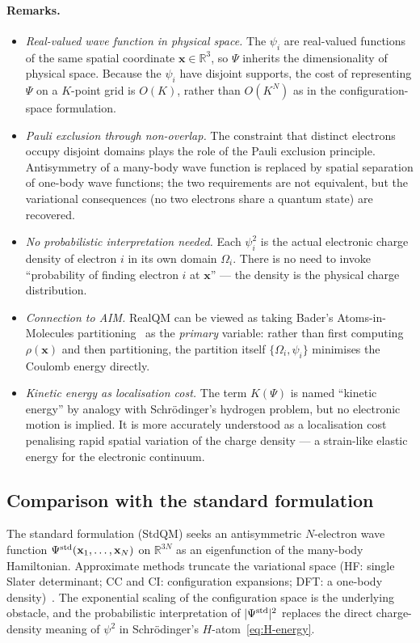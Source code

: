 \documentclass[11pt]{article}
\begin{document}
\paragraph{Remarks.}
\begin{itemize}\setlength{\itemsep}{2pt}
\item \emph{Real-valued wave function in physical space.} The $\psi_i$ are real-valued functions of the same spatial coordinate $\mathbf{x} \in \mathbb{R}^3$, so $\Psi$ inherits the dimensionality of physical space. Because the $\psi_i$ have disjoint supports, the cost of representing $\Psi$ on a $K$-point grid is $O(K)$, rather than $O(K^N)$ as in the configuration-space formulation.
\item \emph{Pauli exclusion through non-overlap.} The constraint that distinct electrons occupy disjoint domains plays the role of the Pauli exclusion principle. Antisymmetry of a many-body wave function is replaced by spatial separation of one-body wave functions; the two requirements are not equivalent, but the variational consequences (no two electrons share a quantum state) are recovered.
\item \emph{No probabilistic interpretation needed.} Each $\psi_i^2$ is the actual electronic charge density of electron $i$ in its own domain $\Omega_i$. There is no need to invoke ``probability of finding electron $i$ at $\mathbf{x}$'' --- the density is the physical charge distribution.
\item \emph{Connection to AIM.} RealQM can be viewed as taking Bader's Atoms-in-Molecules partitioning~\cite{Bader90} as the \emph{primary} variable: rather than first computing $\rho(\mathbf{x})$ and then partitioning, the partition itself $\{\Omega_i, \psi_i\}$ minimises the Coulomb energy directly.
\item \emph{Kinetic energy as localisation cost.} The term $K(\Psi)$ is named ``kinetic energy'' by analogy with Schr\"odinger's hydrogen problem, but no electronic motion is implied. It is more accurately understood as a localisation cost penalising rapid spatial variation of the charge density --- a strain-like elastic energy for the electronic continuum.
\end{itemize}

\subsection{Comparison with the standard formulation}

The standard formulation (StdQM) seeks an antisymmetric $N$-electron wave function $\Psi^{\rm std}(\mathbf{x}_1, \ldots, \mathbf{x}_N)$ on $\mathbb{R}^{3N}$ as an eigenfunction of the many-body Hamiltonian. Approximate methods truncate the variational space (HF: single Slater determinant; CC and CI: configuration expansions; DFT: a one-body density)~\cite{KS65,MHG17}. The exponential scaling of the configuration space is the underlying obstacle, and the probabilistic interpretation of $|\Psi^{\rm std}|^2$ replaces the direct charge-density meaning of $\psi^2$ in Schr\"odinger's $H$-atom~\eqref{eq:H-energy}.
\end{document}
